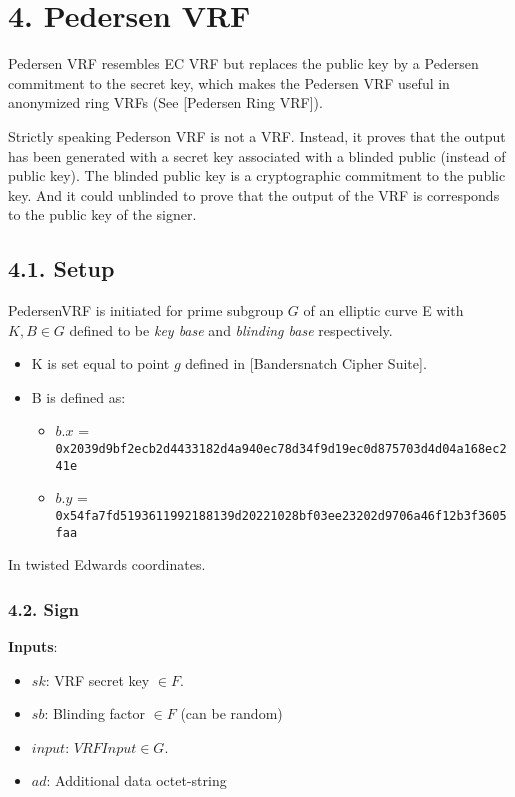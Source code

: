 \documentclass[
]{article}
\providecommand{\tightlist}{%
  \setlength{\itemsep}{0pt}\setlength{\parskip}{0pt}}
\begin{document}
\hypertarget{pedersen-vrf}{%
\section{4. Pedersen VRF}\label{pedersen-vrf}}

Pedersen VRF resembles EC VRF but replaces the public key by a Pedersen
commitment to the secret key, which makes the Pedersen VRF useful in
anonymized ring VRFs (See {[}Pedersen Ring VRF{]}).

Strictly speaking Pederson VRF is not a VRF. Instead, it proves that the
output has been generated with a secret key associated with a blinded
public (instead of public key). The blinded public key is a
cryptographic commitment to the public key. And it could unblinded to
prove that the output of the VRF is corresponds to the public key of the
signer.

\hypertarget{setup}{%
\subsection{4.1. Setup}\label{setup}}

PedersenVRF is initiated for prime subgroup \(G\) of an elliptic curve E
with \(K, B \in G\) defined to be \emph{key base} and \emph{blinding
base} respectively.

\begin{itemize}
\tightlist
\item
  K is set equal to point \(g\) defined in {[}Bandersnatch Cipher
  Suite{]}.
\item
  B is defined as:

  \begin{itemize}
  \tightlist
  \item
    \(b.x\) =
    \texttt{0x2039d9bf2ecb2d4433182d4a940ec78d34f9d19ec0d875703d4d04a168ec241e}
  \item
    \(b.y\) =
    \texttt{0x54fa7fd5193611992188139d20221028bf03ee23202d9706a46f12b3f3605faa}
  \end{itemize}
\end{itemize}

In twisted Edwards coordinates.

\hypertarget{sign-1}{%
\subsubsection{4.2. Sign}\label{sign-1}}

\textbf{Inputs}:

\begin{itemize}
\tightlist
\item
  \(sk\): VRF secret key \(\in F\).
\item
  \(sb\): Blinding factor \(\in F\) (can be random)
\item
  \(input\): \(VRFInput \in G\).
\item
  \(ad\): Additional data octet-string
\end{itemize}
\end{document}
